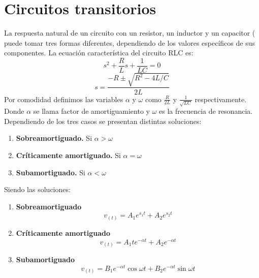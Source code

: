 \documentclass[a4paper,12pt]{report}
\begin{document}
\chapter{Circuitos transitorios}
La respuesta natural de un circuito con un resistor, un inductor y un capacitor ( puede tomar tres formas diferentes, dependiendo de los valores específicos de sus componentes. La ecuación característica del circuito RLC es:
$$
s^{2} + \frac{R}{L}s + \frac{1}{LC} = 0
$$
$$
s = \frac{-R \pm \sqrt{R^{2} - 4L/C}}{2L}
$$
Por comodidad definimos las variables $\alpha$ y $\omega$ como $\frac{R}{2L}$ y $\frac{1}{\sqrt{LC}}$ respectivamente. Donde $\alpha$ se llama factor de amortiguamiento y $\omega$ es la frecuencia de resonancia. Dependiendo de los tres casos se presentan distintas soluciones:
\begin{enumerate}
\item \textbf{Sobreamortiguado.} Si $\alpha > \omega$
\item \textbf{Críticamente amortiguado.} Si $\alpha = \omega$
\item \textbf{Subamortiguado.} Si $\alpha < \omega$
\end{enumerate}
Siendo las soluciones:
\begin{enumerate}
\item \textbf{Sobreamortiguado}
$$
v_{(t)} = A_{1}e^{s_{1}t} + A_{2}e^{s_{2}t}
$$
\item \textbf{Críticamente amortiguado}
$$
v_{(t)} = A_{1}te^{-\alpha t} + A_{2}e^{-\alpha t}
$$
\item \textbf{Subamortiguado}
$$
v_{(t)} = B_{1}e^{-\alpha t}\cos \omega t + B_{2}e^{-\alpha t}\sin \omega t
$$
\end{enumerate}
\end{document}
